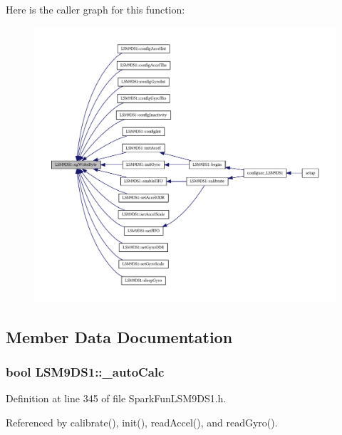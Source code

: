 Here is the caller graph for this function\+:
\nopagebreak
\begin{figure}[H]
\begin{center}
\leavevmode
\includegraphics[width=350pt]{class_l_s_m9_d_s1_a263eed4b52ad087a1195755c6ba49e62_icgraph}
\end{center}
\end{figure}




\subsection{Member Data Documentation}
\subsubsection[{\texorpdfstring{\+\_\+auto\+Calc}{\_autoCalc}}]{\setlength{\rightskip}{0pt plus 5cm}bool L\+S\+M9\+D\+S1\+::\+\_\+auto\+Calc\hspace{0.3cm}{\ttfamily [protected]}}\hypertarget{class_l_s_m9_d_s1_a8460d00ea0bb496c5d49190a34e54588}{}\label{class_l_s_m9_d_s1_a8460d00ea0bb496c5d49190a34e54588}


Definition at line 345 of file Spark\+Fun\+L\+S\+M9\+D\+S1.\+h.



Referenced by calibrate(), init(), read\+Accel(), and read\+Gyro().


